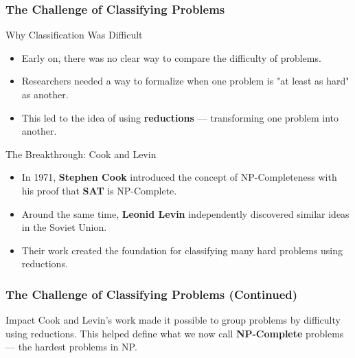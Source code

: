 \begin{frame}
    \frametitle{The Challenge of Classifying Problems}

    \begin{block}{Why Classification Was Difficult}
        \begin{itemize}
            \item Early on, there was no clear way to compare the difficulty of problems.
            \item Researchers needed a way to formalize when one problem is "at least as hard" as another.
            \item This led to the idea of using \textbf{reductions} — transforming one problem into another.
        \end{itemize}
    \end{block}

    \vspace{0.5em}

    \begin{block}{The Breakthrough: Cook and Levin}
        \begin{itemize}
            \item In 1971, \textbf{Stephen Cook} introduced the concept of NP-Completeness with his proof that \textbf{SAT} is NP-Complete.
            \item Around the same time, \textbf{Leonid Levin} independently discovered similar ideas in the Soviet Union.
            \item Their work created the foundation for classifying many hard problems using reductions.
        \end{itemize}
    \end{block}

    \vspace{0.5em}
\end{frame}
\begin{frame}
    \frametitle{The Challenge of Classifying Problems (Continued)}
    \begin{block}{Impact}
        Cook and Levin's work made it possible to group problems by difficulty using reductions.
        This helped define what we now call \textbf{NP-Complete} problems — the hardest problems in NP.
    \end{block}
\end{frame}

